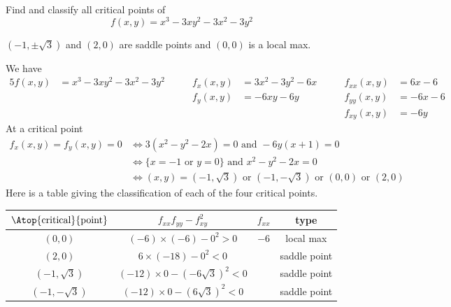 \begin{question}[M200 2000D] %
 Find and classify all critical points of
$$
f(x,y)=x^3-3xy^2-3x^2-3y^2
$$
\end{question}

%

\begin{answer}
$(-1,\pm\sqrt{3})$ and $(2,0)$ are saddle points and 
$(0,0)$ is  a local max.
\end{answer}

\begin{solution}
We have
\begin{alignat*}{5}
f(x,y)&=x^3-3xy^2-3x^2-3y^2\qquad &
f_x(x,y)&=3x^2-3y^2-6x\qquad &
f_{xx}(x,y)&=6x-6 \\
 & & f_y(x,y)&=-6xy-6y &
f_{yy}(x,y)&=-6x-6 \\
 & & & &f_{xy}(x,y)&=-6y
\end{alignat*}
At a critical point
\begin{align*}
f_x(x,y)=f_y(x,y)=0
&\iff 3(x^2-y^2-2x)=0\text{ and }-6y(x+1)=0 \\
&\iff \{x=-1\text{ or }y=0\}\text{ and }x^2-y^2-2x=0 \\
&\iff (x,y)=(-1,\sqrt{3})\text{ or }(-1,-\sqrt{3})\text{ or }(0,0)
\text{ or }(2,0)
\end{align*}
Here is a table giving the classification of each of the four critical
points.
\begin{center}
\renewcommand{\arraystretch}{1.3}
     \begin{tabular}{|c|c|c|c|}
     \hline
    $\Atop{\text{critical}}{\text{point}}$  & $f_{xx}f_{yy}-f_{xy}^2$ & 
                                                          $f_{xx}$ & type \\    
    \hline
     $(0,0)$   & $(-6)\times(-6)-0^2>0$ & $-6$ & local max \\ \hline
     $(2,0)$   & $6\times(-18)-0^2<0$   &      & saddle point \\  \hline
  $(-1,\sqrt{3})$ & $(-12)\times0-(-6\sqrt{3})^2<0$ & & saddle point \\ \hline
  $(-1,-\sqrt{3})$ &$(-12)\times 0-(6\sqrt{3})^2<0$ & & saddle point \\ \hline
     \end{tabular}
\renewcommand{\arraystretch}{1.0}
\end{center}
\end{solution}

